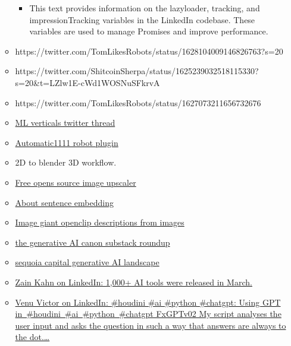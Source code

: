 \begin{itemize}
\begin{itemize}
\begin{itemize}
    \item
      This text provides information on the lazyloader, tracking, and
      impressionTracking variables in the LinkedIn codebase. These
      variables are used to manage Promises and improve performance.
    \end{itemize}
  \item
    https://twitter.com/TomLikesRobots/status/1628104009146826763?s=20
  \item
    https://twitter.com/ShitcoinSherpa/status/1625239032518115330?s=20\&t=LZlw1E-cWd1WOSNuSFkrvA
  \item
    https://twitter.com/TomLikesRobots/status/1627073211656732676
  \item
    \href{https://twitter.com/daniel_eckler/status/1564601398284664832?s=20\&t=79zgNMrzbD89cQto2u5j-Q}{ML
    verticals twitter thread}
  \item
    \href{https://github.com/AUTOMATIC1111/stable-diffusion-webui/wiki/Developing-extensions}{Automatic1111
    robot plugin}
  \item
    2D to blender 3D workflow.
  \item
    \href{https://upscayl.github.io/}{Free opens source image upscaler}
  \item
    \href{https://txt.cohere.ai/sentence-word-embeddings/}{About
    sentence embedding}
  \item
    \href{https://laion.ai/blog/giant-openclip/}{Image giant openclip
    descriptions from images}
  \item
    \href{https://metavert.substack.com/p/the-generative-ai-canon}{the
    generative AI canon substack roundup}
  \item
    \href{https://www.sequoiacap.com/article/generative-ai-a-creative-new-world/}{sequoia
    capital generative AI landscape}
  \item
    \href{https://www.linkedin.com/posts/zainkahn_1000-ai-tools-were-released-in-march-activity-7048285306101358592-4wAA?utm_source=share\&utm_medium=member_android}{Zain
    Kahn on LinkedIn: 1,000+ AI tools were released in March.}
  \item
    \href{https://www.linkedin.com/posts/venu-victor-aa7ab865_houdini-ai-python-activity-7030460619195629568--Sx9?}{Venu
    Victor on LinkedIn: \#houdini \#ai \#python \#chatgpt: Using GPT
    in~\#houdini~\#ai~\#python~\#chatgpt FxGPTv02 My script analyses the
    user input and asks the question in such a way that answers are
    always to the dot.\ldots{}}


\end{itemize}
\end{itemize}
